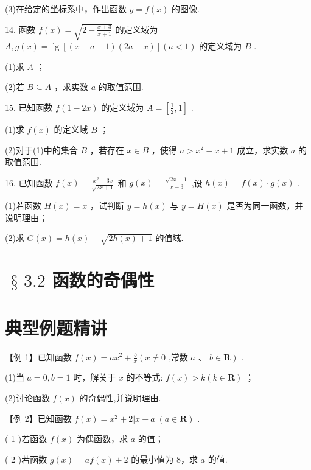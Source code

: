 (3)在给定的坐标系中，作出函数 $y = f\left( x\right)$ 的图像.

14. 函数 $f\left( x\right)  = \sqrt{2 - \frac{x + 3}{x + 1}}$ 的定义域为 $A,g\left( x\right)  = \lg \left\lbrack  {\left( {x - a - 1}\right) \left( {{2a} - x}\right) }\right\rbrack  \left( {a < 1}\right)$ 的定义域为 $B$ .

(1)求 $A$ ；

(2)若 $B \subseteq  A$ ，求实数 $a$ 的取值范围.

15. 已知函数 $f\left( {1 - {2x}}\right)$ 的定义域为 $A = \left\lbrack  {\frac{1}{2},1}\right\rbrack$ .

(1)求 $f\left( x\right)$ 的定义域 $B$ ；

(2)对于(1)中的集合 $B$ ，若存在 $x \in  B$ ，使得 $a > {x}^{2} - x + 1$ 成立，求实数 $a$ 的取值范围.

16. 已知函数 $f\left( x\right)  = \frac{{x}^{2} - {3x}}{\sqrt{{2x} + 1}}$ 和 $g\left( x\right)  = \frac{\sqrt{{2x} + 1}}{x - 3}$ ,设 $h\left( x\right)  = f\left( x\right)  \cdot  g\left( x\right)$ .

(1)若函数 $H\left( x\right)  = x$ ，试判断 $y = h\left( x\right)$ 与 $y = H\left( x\right)$ 是否为同一函数，并说明理由；

(2)求 $G\left( x\right)  = h\left( x\right)  - \sqrt{{2h}\left( x\right)  + 1}$ 的值域.

\section*{$\text{ § }{3.2}$ 函数的奇偶性}

\section*{典型例题精讲}

【例 1】已知函数 $f\left( x\right)  = a{x}^{2} + \frac{b}{x}\left( {x \neq  0}\right.$ ,常数 $\left. {a\text{ 、 }b \in  \mathbf{R}}\right)$ .

(1)当 $a = 0,b = 1$ 时，解关于 $x$ 的不等式: $f\left( x\right)  > k\left( {k \in  \mathbf{R}}\right)$ ；

(2)讨论函数 $f\left( x\right)$ 的奇偶性,并说明理由.

【例 2】已知函数 $f\left( x\right)  = {x}^{2} + 2\left| {x - a}\right| \left( {a \in  \mathbf{R}}\right)$ .

( 1 )若函数 $f\left( x\right)$ 为偶函数，求 $a$ 的值；

( 2 )若函数 $g\left( x\right)  = {af}\left( x\right)  + 2$ 的最小值为 8，求 $a$ 的值.

